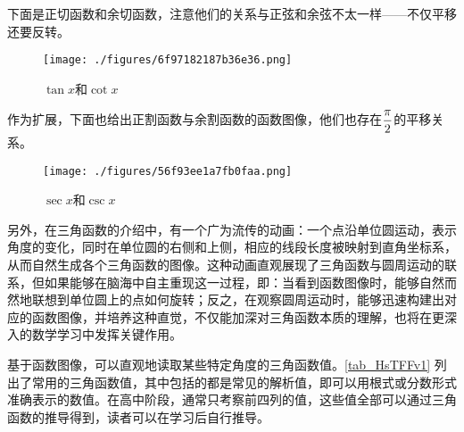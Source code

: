 下面是正切函数和余切函数，注意他们的关系与正弦和余弦不太一样——不仅平移还要反转。

\begin{figure}[ht]
\centering
\texttt{[image: ./figures/6f97182187b36e36.png]}
\caption{$\tan x$和$\cot x$} \label{fig_HsTFFv_3}
\end{figure}

作为扩展，下面也给出正割函数与余割函数的函数图像，他们也存在$\displaystyle{\pi\over2}$的平移关系。

\begin{figure}[ht]
\centering
\texttt{[image: ./figures/56f93ee1a7fb0faa.png]}
\caption{$\sec x$和$\csc x$} \label{fig_HsTFFv_2}
\end{figure}

另外，在三角函数的介绍中，有一个广为流传的动画：一个点沿单位圆运动，表示角度的变化，同时在单位圆的右侧和上侧，相应的线段长度被映射到直角坐标系，从而自然生成各个三角函数的图像。这种动画直观展现了三角函数与圆周运动的联系，但如果能够在脑海中自主重现这一过程，即：当看到函数图像时，能够自然而然地联想到单位圆上的点如何旋转；反之，在观察圆周运动时，能够迅速构建出对应的函数图像，并培养这种直觉，不仅能加深对三角函数本质的理解，也将在更深入的数学学习中发挥关键作用。

基于函数图像，可以直观地读取某些特定角度的三角函数值。\autoref{tab_HsTFFv1} 列出了常用的三角函数值，其中包括的都是常见的解析值，即可以用根式或分数形式准确表示的数值。在高中阶段，通常只考察前四列的值，这些值全部可以通过三角函数的推导得到，读者可以在学习后自行推导。

